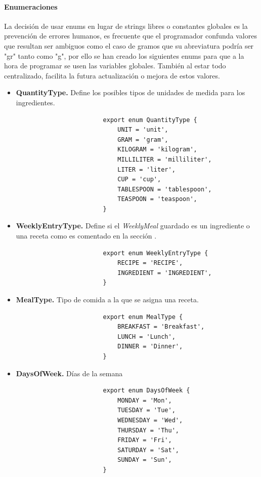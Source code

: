 \documentclass[twoside, openright, 11pt]{report}
\begin{document}
				\paragraph{Enumeraciones}
				La decisión de usar enums en lugar de strings libres o constantes globales es la prevención de errores humanos, es frecuente que el programador confunda valores que resultan ser ambiguos como el caso de gramos que su abreviatura podría ser "gr" tanto como "g", por ello se han creado los siguientes enums para que a la hora de programar se usen las variables globales. También al estar todo centralizado, facilita la futura actualización o mejora de estos valores.
				
				\begin{itemize}
					\item \textbf{QuantityType.} Define los posibles tipos de unidades de medida para los ingredientes.
					\begin{lstlisting}
						export enum QuantityType {
							UNIT = 'unit',
							GRAM = 'gram',
							KILOGRAM = 'kilogram',
							MILLILITER = 'milliliter',
							LITER = 'liter',
							CUP = 'cup',
							TABLESPOON = 'tablespoon',
							TEASPOON = 'teaspoon',
						}
					\end{lstlisting}
					\item \textbf{WeeklyEntryType.} Define si el \textit{WeeklyMeal} guardado es un ingrediente o una receta como es comentado en la sección . 
					\begin{lstlisting}
						export enum WeeklyEntryType {
							RECIPE = 'RECIPE',
							INGREDIENT = 'INGREDIENT',
						}
					\end{lstlisting}
					\item \textbf{MealType.} Tipo de comida a la que se asigna una receta.
					\begin{lstlisting}
						export enum MealType {
							BREAKFAST = 'Breakfast',
							LUNCH = 'Lunch',
							DINNER = 'Dinner',
						}
					\end{lstlisting}
					\item \textbf{DaysOfWeek.} Días de la semana
					\begin{lstlisting}
						export enum DaysOfWeek {
							MONDAY = 'Mon',
							TUESDAY = 'Tue',
							WEDNESDAY = 'Wed',
							THURSDAY = 'Thu',
							FRIDAY = 'Fri',
							SATURDAY = 'Sat',
							SUNDAY = 'Sun',
						}
					\end{lstlisting}
				\end{itemize}
				
\end{document}
